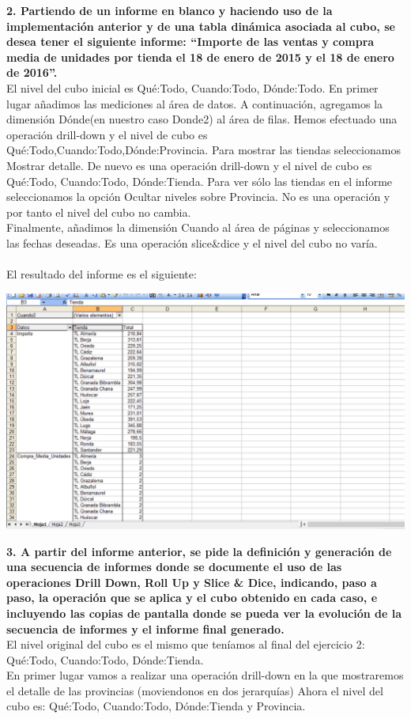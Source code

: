 \documentclass[paper=a4, fontsize=11pt, spanish]{scrartcl}
\numberwithin{equation}{section} %
\numberwithin{figure}{section} %
\numberwithin{table}{section} %
\begin{document}
\textbf{2. Partiendo de un informe en blanco y haciendo uso de la implementación anterior y de una tabla dinámica asociada al cubo, se desea tener el siguiente informe: “Importe de las ventas y compra media de unidades por tienda el 18 de enero de 2015 y el 18 de enero de 2016”.}
\\
El nivel del cubo inicial es Qué:Todo, Cuando:Todo, Dónde:Todo. En primer lugar añadimos las mediciones al área de datos. A continuación, agregamos la dimensión Dónde(en nuestro caso Donde2) al área de filas. Hemos efectuado una operación drill-down y el nivel de cubo es Qué:Todo,Cuando:Todo,Dónde:Provincia. Para mostrar las tiendas seleccionamos Mostrar detalle. De nuevo es una operación drill-down y el nivel de cubo es Qué:Todo, Cuando:Todo, Dónde:Tienda. Para ver sólo las tiendas en el informe seleccionamos la opción Ocultar niveles sobre Provincia. No es una operación y por tanto el nivel del cubo no cambia.\\
Finalmente, añadimos la dimensión Cuando al área de páginas y seleccionamos las fechas deseadas. Es una operación slice\&dice y el nivel del cubo no varía.\\
\\
El resultado del informe es el siguiente:
\\
\begin{center}
	\includegraphics[scale=0.75]{img9.png}
\end{center}


\textbf{3. A partir del informe anterior, se pide la definición y generación de una secuencia de informes donde se documente el uso de las operaciones Drill Down, Roll Up y Slice \& Dice, indicando, paso a paso, la operación que se aplica y el cubo obtenido en cada caso, e incluyendo las copias de pantalla donde se pueda ver la evolución de la secuencia de informes y el informe final generado.}
\\
El nivel original del cubo es el mismo que teníamos al final del ejercicio 2: Qué:Todo, Cuando:Todo, Dónde:Tienda.\\
En primer lugar vamos a realizar una operación drill-down en la que mostraremos el detalle de las provincias (moviendonos en dos jerarquías)
Ahora el nivel del cubo es: Qué:Todo, Cuando:Todo, Dónde:Tienda y Provincia.
\end{document}

